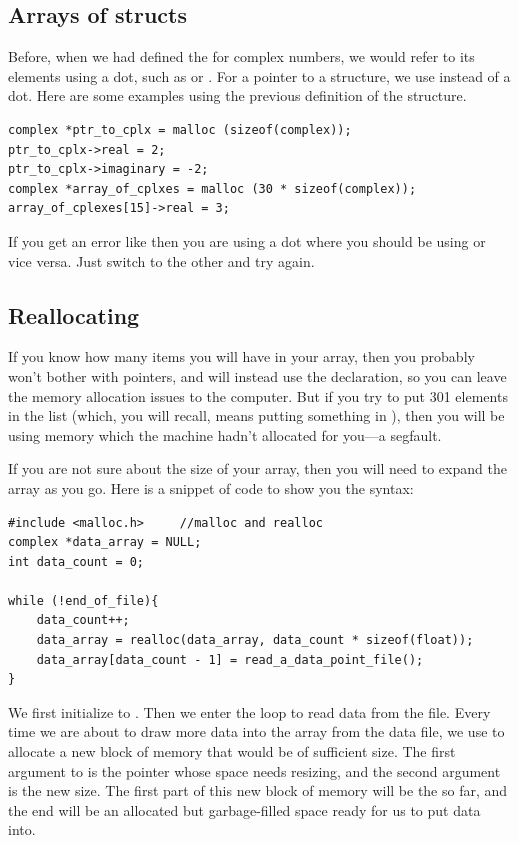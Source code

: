 \subsection{Arrays of structs}	
Before, when we had defined the  for complex numbers, we would refer to its elements using a
dot, such as  or . For a pointer to a structure, we use \cind{$->$} instead of 
a dot.  Here are some examples using the previous definition of the  structure.
\begin{lstlisting}
complex *ptr_to_cplx = malloc (sizeof(complex));
ptr_to_cplx->real = 2;
ptr_to_cplx->imaginary = -2;
complex *array_of_cplxes = malloc (30 * sizeof(complex));
array_of_cplexes[15]->real = 3;
\end{lstlisting}

If you get an error like  then you are
using a dot where you should be using \cind{$->$} or vice versa. Just switch to the other and try again.


\subsection{Reallocating} If you know how many items you will have
in your array, then you probably won't bother with pointers, and will
instead use the  declaration, so you can leave
the memory allocation issues to the computer. But if you try to put 301
elements in the list (which, you will recall, means putting something
in ), then you will be using memory which the
machine hadn't
allocated for you---a segfault.

If you are not sure about the size of your array, then you will need to
expand the array as you go. Here is a snippet of code to show you the syntax:
\begin{lstlisting}
#include <malloc.h>     //malloc and realloc
complex *data_array = NULL;
int data_count = 0;

while (!end_of_file){
    data_count++;
    data_array = realloc(data_array, data_count * sizeof(float));
    data_array[data_count - 1] = read_a_data_point_file();
}
\end{lstlisting}

We first initialize  to .
Then
we enter the loop to read data from the file. Every time we are about to draw
more data into the array from the data file, we use  to
allocate a new block of memory that would be of sufficient size. The first
argument to  is the pointer whose space needs resizing,
and the second argument is the new size.  The first part of this new
block of memory will be the  so far, and the end will
be an allocated but garbage-filled space ready for us to put data into.

